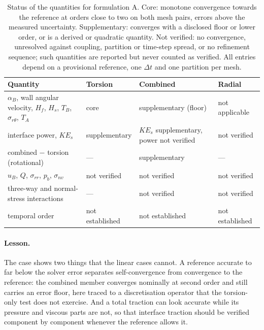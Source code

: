 \begin{table}[htbp]
	\centering
	\footnotesize
	\setlength{\tabcolsep}{3pt}
	\caption{Status of the quantities for formulation A. Core: monotone convergence towards the reference at orders close to two on both mesh pairs, errors above the measured uncertainty. Supplementary: converges with a disclosed floor or lower order, or is a derived or quadratic quantity. Not verified: no convergence, unresolved against coupling, partition or time-step spread, or no refinement sequence; such quantities are reported but never counted as verified. All entries depend on a provisional reference, one $\Delta t$ and one partition per mesh.}
	\label{tab:rot_scope}
	\begin{tabular}{p{4.6cm}p{2.5cm}p{3.2cm}p{2.4cm}}
		\toprule
		Quantity & Torsion & Combined & Radial \\
		\midrule
		$\alpha_B$, wall angular velocity, $H_f$, $H_s$, $T_B$, $\sigma_{r\theta}$, $T_A$ & core & supplementary (floor) & not applicable \\
		interface power, $KE_s$ & supplementary & $KE_s$ supplementary, power not verified & not verified \\
		combined $-$ torsion (rotational) & --- & supplementary & --- \\
		$u_B$, $Q$, $\sigma_{rr}$, $p_b$, $\sigma_{nv}$ & not verified & not verified & not verified \\
		three-way and normal-stress interactions & --- & not verified & not verified \\
		temporal order & not established & not established & not established \\
		\bottomrule
	\end{tabular}
\end{table}

\paragraph{Lesson.}
The case shows two things that the linear cases cannot.
A reference accurate to far below the solver error separates self-convergence from convergence to the reference: the combined member converges nominally at second order and still carries an error floor, here traced to a discretisation operator that the torsion-only test does not exercise.
And a total traction can look accurate while its pressure and viscous parts are not, so that interface traction should be verified component by component whenever the reference allows it.

